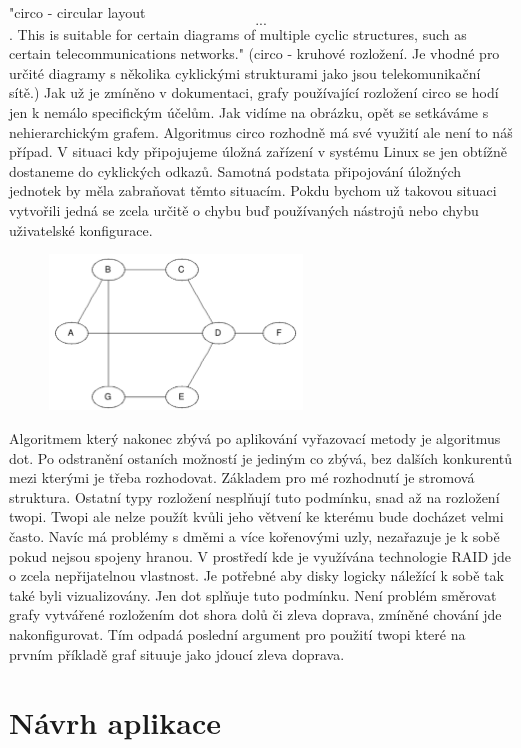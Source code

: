 \documentclass[color,table,oneside,nolot,nolof]{fithesis}
\begin{document}
	"circo - circular layout \[...\]. This is suitable for certain diagrams of multiple cyclic structures, such as certain telecommunications networks."\cite{graphviz_layout} (circo -
	kruhové rozložení. Je vhodné pro určité diagramy s několika cyklickými strukturami jako jsou telekomunikační sítě.) Jak už je zmíněno v dokumentaci, grafy používající rozložení 
	circo se hodí jen k nemálo specifickým účelům. Jak vidíme na obrázku, opět se setkáváme s nehierarchickým grafem. Algoritmus circo rozhodně má své využití ale není to náš případ. V
	situaci kdy připojujeme úložná zařízení v systému Linux se jen obtížně dostaneme do cyklických odkazů. Samotná podstata připojování úložných jednotek by měla zabraňovat těmto
	situacím. Pokdu bychom už takovou situaci vytvořili jedná se zcela určitě o chybu buď používaných nástrojů nebo chybu uživatelské konfigurace. 
\begin{figure}
	\centering
	\includegraphics[width=0.6\textwidth]{pictures/circo_example.png} 
\end{figure}

	Algoritmem který nakonec zbývá po aplikování vyřazovací metody je algoritmus dot. Po odstranění ostaních možností je jediným co zbývá, bez dalších konkurentů mezi kterými je třeba 
	rozhodovat. Základem pro mé rozhodnutí je stromová struktura. Ostatní typy rozložení nesplňují tuto podmínku, snad až na rozložení twopi. Twopi ale nelze použít kvůli jeho větvení
	ke kterému bude docházet velmi často. Navíc má problémy s dměmi a více kořenovými uzly, nezařazuje je k sobě pokud nejsou spojeny hranou. V prostředí kde je využívána technologie
	RAID jde o zcela nepřijatelnou vlastnost. Je potřebné aby disky logicky náležící k sobě tak také byli vizualizovány. Jen dot splňuje tuto podmínku. Není problém směrovat grafy 
	vytvářené rozložením dot shora dolů či zleva doprava, zmíněné chování jde nakonfigurovat. Tím odpadá poslední argument pro použití twopi které na prvním příkladě graf situuje jako
	jdoucí zleva doprava.

\chapter{Návrh aplikace}
\end{document}

